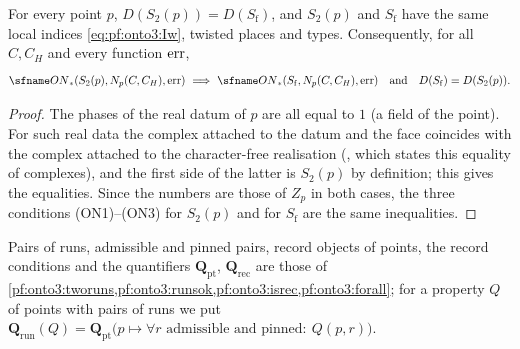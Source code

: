 \begin{lemma}\label{pf:onto3:split}
For every point $p$, $D(S_2(p))=D(S_{\mathrm f})$, and $S_2(p)$ and $S_{\mathrm f}$ have the same local indices
\eqref{eq:pf:onto3:Iw}, twisted places and types. Consequently, for all $C,C_H$ and every function $\mathrm{err}$,
\begin{equation}\label{eq:pf:onto3:split}
\ontothreeONw(S_2(p),N_p(C,C_H),\ontothreeerr)\ \Longrightarrow\ \ontothreeONw(S_{\mathrm f},N_p(C,C_H),
\ontothreeerr)\quad\text{and}\quad D(S_{\mathrm f})=D(S_2(p)).
\end{equation}
\end{lemma}

\begin{proof}
The phases of the real datum of $p$ are all equal to $1$ (a field of the point). For such real data the complex
attached to the datum and the face coincides with the complex attached to the character-free realisation
(, which states this equality of complexes), and the first side of
the latter is $S_2(p)$ by definition; this gives the equalities. Since the numbers are those of $Z_p$ in both cases,
the three conditions (ON1)--(ON3) for $S_2(p)$ and for $S_{\mathrm f}$ are the same inequalities.
\end{proof}

Pairs of runs, admissible and pinned pairs, record objects of points, the record conditions and the
quantifiers $\mathbf Q_{\mathrm{pt}}$, $\mathbf Q_{\mathrm{rec}}$ are those of
\cref{pf:onto3:tworuns,pf:onto3:runsok,pf:onto3:isrec,pf:onto3:forall}; for a property $Q$ of points with pairs of runs
we put $\mathbf Q_{\mathrm{run}}(Q)=\mathbf Q_{\mathrm{pt}}\bigl(p\mapsto\forall r\text{ admissible and pinned}:\
Q(p,r)\bigr)$.

